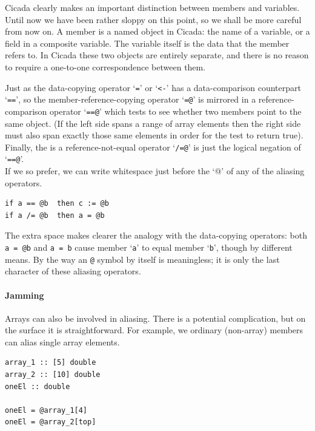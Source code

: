 \documentclass{article}
\newenvironment{code}{
       \begin{list}{}{
               \setlength{\leftmargin}{.4in}
               \setlength{\rightmargin}{0in}
               \setlength{\topsep}{.2in}
       }
       \small
       \item[] }
       { \end{list}   }
\begin{document}
Cicada clearly makes an important distinction between members and variables.  Until now we have been rather sloppy on this point, so we shall be more careful from now on.  A member is a named object in Cicada:  the name of a variable, or a field in a composite variable.  The variable itself is the data that the member refers to.  In Cicada these two objects are entirely separate, and there is no reason to require a one-to-one correspondence between them.

Just as the data-copying operator `\verb#=#' or `\verb#<-#' has a data-comparison counterpart `\verb#==#', so the member-reference-copying operator `\verb#=@#'  is mirrored in a reference-comparison operator `\verb#==@#' which tests to see whether two members point to the same object.  (If the left side spans a range of array elements then the right side must also span exactly those same elements in order for the test to return true).  Finally, the is a reference-not-equal operator `\verb#/=@#' is just the logical negation of `\verb#==@#'.\\

If we so prefer, we can write whitespace just before the `@' of any of the aliasing operators.

\begin{code} \begin{verbatim}
if a == @b  then c := @b
if a /= @b  then a = @b
\end{verbatim} \end{code}

\noindent The extra space makes clearer the analogy with the data-copying operators:  both \verb#a = @b# and \verb#a = b# cause member `\verb#a#' to equal member `\verb#b#', though by different means.  By the way an \texttt{@} symbol by itself is meaningless; it is only the last character of these aliasing operators.



\paragraph{Jamming} 

Arrays can also be involved in aliasing.  There is a potential complication, but on the surface it is straightforward.  For example, we ordinary (non-array) members can alias single array elements.

\begin{code} \begin{verbatim}
array_1 :: [5] double
array_2 :: [10] double
oneEl :: double

oneEl = @array_1[4]
oneEl = @array_2[top]
\end{verbatim} \end{code}
\end{document}
